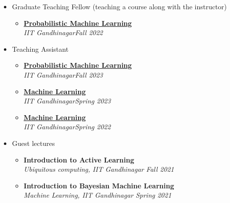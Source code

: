 \documentclass[letter,10pt]{article}
\begin{document}
\begin{itemize}
\item[] Graduate Teaching Fellow (teaching a course along with the instructor)
\begin{itemize}
 \item
    \href{https://nipunbatra.github.io/pml2022/}{\textbf{Probabilistic Machine Learning}}\\ 
    \textit{IIT Gandhinagar}\hfill \textit{Fall 2022}\\
\end{itemize}
\item[] Teaching Assistant
\begin{itemize}
\item 
    \href{https://nipunbatra.github.io/pml2023/}{\textbf{Probabilistic Machine Learning}}\\ 
    \textit{IIT Gandhinagar}\hfill \textit{Fall 2023}\\
\item
    \href{https://nipunbatra.github.io/ml2023/}{\textbf{Machine Learning}}\\
    \textit{IIT Gandhinagar}\hfill \textit{Spring 2023}\\
 \item
    \href{https://nipunbatra.github.io/ml2022/}{\textbf{Machine Learning}}\\ 
    \textit{IIT Gandhinagar}\hfill \textit{Spring 2022}\\

\end{itemize}

\item[] Guest lectures
\begin{itemize}
 \item
    \textbf{Introduction to Active Learning} \\
    \textit{Ubiquitous computing, IIT Gandhinagar} \hfill \textit{Fall 2021}\\
 \item
    \textbf{Introduction to Bayesian Machine Learning} \\
    \textit{Machine Learning, IIT Gandhinagar} \hfill \textit{Spring 2021} 
\end{itemize}
\end{itemize}

\end{document}
